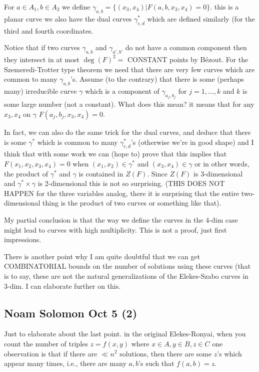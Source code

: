 For $a\in A_1, b \in A_2$ we define
$\gamma_{a,b} = \{(x_3,x_4) | F(a,b,x_3,x_4)=0\}$.
this is a planar curve
we also have the dual curves $\gamma^*_{c,d}$ which are defined similarly (for
the third and fourth coordinates.

Notice that if two curves $\gamma_{a,b}$ and $\gamma_{a',b'}$ do not have a
common component then they intersect in at most $\deg(F)^2=$ CONSTANT points
by B\'ezout.
For the Szemeredi-Trotter type theorem we need that there are very few
curves which are common to many $\gamma_{a,b}$'s.
Assume (to the contrary) that there is some (perhaps many) irreducible
curve $\gamma$ which is a component of
$\gamma_{a_j,b_j}$ for $j=1,\ldots, k$ and $k$ is some large number (not a
constant).
What does this mean? it means that for any $x_3,x_4$ on $\gamma$
$F(a_j,b_j, x_3,x_4)=0$.

In fact, we can also do the same trick for the dual curves, and deduce that
there is some $\gamma^*$ which is common to many $\gamma^*_{c,d}$'s
(otherwise we're in good shape) and I think that with some work we can
(hope to) prove that this implies that
$F(x_1,x_2,x_3,x_4)=0$ when $(x_1,x_2)\in \gamma^*$ and $(x_3,x_4)\in \gamma$
or in other words, the product of $\gamma^*$ and $\gamma$ is contained in $Z(F)$.
Since $Z(F)$ is 3-dimensional and $\gamma^*\times \gamma$ is 2-dimensional this
is not so surprising. (THIS DOES NOT HAPPEN for the three variables analog,
there it is surprising that the entire two-dimensional thing is the product
of two curves or something like that).

My partial conclusion is that the way we define the curves in the 4-dim
case might lead to curves with high multiplicity. This is not a proof, just
first impressions.

There is another point why I am quite doubtful that we can get
COMBINATORIAL bounds on the number of solutions using these curves (that is
to say, these are not the natural generalizations of the Elekes-Szabo
curves in 3-dim. I can elaborate further on this.

\subsection{Noam Solomon Oct 5 (2)}
Just to elaborate about the last point.
in the original Elekes-Ronyai, when you count the number of triples
$z=f(x,y)$ where $x\in A, y\in B, z\in C$
one observation is that if there are $\ll n^2$ solutions, then there are some
$z$'s which appear many times, i.e., there are many $a,b$'s such that $f(a,b)=z$.

